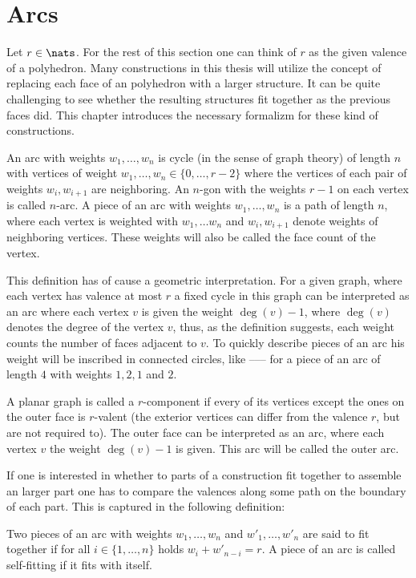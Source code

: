 \section{Arcs}

Let $r \in \nats$. For the rest of this section one can think of $r$ as the given valence of a polyhedron. Many constructions in this thesis will utilize the concept of replacing each face of an polyhedron with a larger structure. It can be quite challenging to see whether the resulting structures fit together as the previous faces did. This chapter introduces the necessary formalizm for these kind of constructions.

\begin{definition}[Arc]
  An arc with weights $w_1, \dots, w_n$ is cycle (in the sense of graph theory) of length $n$ with vertices of weight $w_1, \dots, w_n \in \{0, \dots, r - 2\}$ where the vertices of each pair of weights $w_i, w_{i+1}$ are neighboring. An $n$-gon with the weights $r-1$ on each vertex is called $n$-arc. A piece of an arc with weights $w_1, \dots, w_n$ is a path of length $n$, where each vertex is weighted with $w_1, \dots w_n$ and $w_i, w_{i+1}$ denote weights of neighboring vertices. These weights will also be called the face count of the vertex. 
\end{definition}

This definition has of cause a geometric interpretation. For a given graph, where each vertex has valence at most $r$ a fixed cycle in this graph can be interpreted as an arc where each vertex $v$ is given the weight $\deg (v) - 1$, where $\deg (v)$ denotes the degree of the vertex $v$, thus, as the definition suggests, each weight counts the number of faces adjacent to $v$. To quickly describe pieces of an arc his weight will be inscribed in connected circles, like  ------ for a piece of an arc of length $4$ with weights $1, 2, 1$ and $2$.
\begin{definition}
  A planar graph is called a $r$-component if every of its vertices except the ones on the outer face is $r$-valent (the exterior vertices can differ from the valence $r$, but are not required to). The outer face can be interpreted as an arc, where each vertex $v$ the weight $\deg(v) - 1$ is given. This arc will be called the outer arc.
\end{definition}

If one is interested in whether to parts of a construction fit together to assemble an larger part one has to compare the valences along some path on the boundary of each part. This is captured in the following definition:
\begin{definition}
  Two pieces of an arc with weights $w_1, \dots, w_{n}$ and $w'_1, \dots, w'_{n}$ are said to fit together if for all $i \in \{1, \dots, n \}$ holds $w_i + w'_{n-i} = r$. A piece of an arc is called self-fitting if it fits with itself.
\end{definition}

